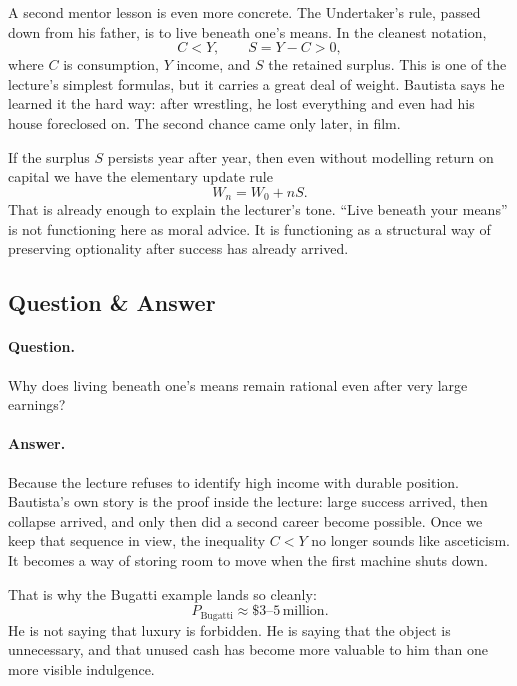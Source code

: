 A second mentor lesson is even more concrete. The Undertaker's rule, passed down from his father, is to live beneath one's means. In the cleanest notation,
\begin{equation}
C<Y,\qquad S=Y-C>0,
\end{equation}
where \(C\) is consumption, \(Y\) income, and \(S\) the retained surplus. This is one of the lecture's simplest formulas, but it carries a great deal of weight. Bautista says he learned it the hard way: after wrestling, he lost everything and even had his house foreclosed on. The second chance came only later, in film.

If the surplus \(S\) persists year after year, then even without modelling return on capital we have the elementary update rule
\begin{equation}
W_n=W_0+nS.
\end{equation}
That is already enough to explain the lecturer's tone. ``Live beneath your means'' is not functioning here as moral advice. It is functioning as a structural way of preserving optionality after success has already arrived.

\subsection{Question \& Answer}

\paragraph{Question.} Why does living beneath one's means remain rational even after very large earnings?

\paragraph{Answer.} Because the lecture refuses to identify high income with durable position. Bautista's own story is the proof inside the lecture: large success arrived, then collapse arrived, and only then did a second career become possible. Once we keep that sequence in view, the inequality \(C<Y\) no longer sounds like asceticism. It becomes a way of storing room to move when the first machine shuts down.

That is why the Bugatti example lands so cleanly:
\begin{equation}
P_{\text{Bugatti}} \approx \$3\text{--}5\,\text{million}.
\end{equation}
He is not saying that luxury is forbidden. He is saying that the object is unnecessary, and that unused cash has become more valuable to him than one more visible indulgence.

